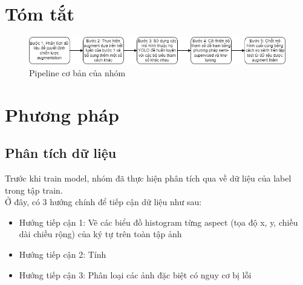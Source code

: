 \documentclass[a4paper,12pt]{article}
\begin{document}
\section{Tóm tắt}
\begin{figure}[ht]
    \centering
    \includegraphics[width=0.5\linewidth]{images/Pipeline.png}
    \caption{Pipeline cơ bản của nhóm}
\end{figure}

\section{Phương pháp}
\subsection{Phân tích dữ liệu}

Trước khi train model, nhóm đã thực hiện phân tích qua về dữ liệu của label trong tập train.
\\
Ở đây, có 3 hướng chính để tiếp cận dữ liệu như sau:
\begin{itemize}
    \item Hướng tiếp cận 1: Vẽ các biểu đồ histogram từng aspect (tọa độ x, y, chiều dài chiều rộng) của ký tự trên toàn tập ảnh
    \item Hướng tiếp cận 2: Tính 
    \item Hướng tiếp cận 3: Phân loại các ảnh đặc biệt có nguy cơ bị lỗi
\end{itemize}
\end{document}
